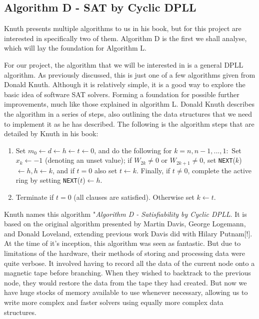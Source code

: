 \documentclass{article}
\begin{document}
\subsection{Algorithm D - SAT by Cyclic DPLL}
Knuth presents multiple algorithms to us in his book, but for this project are interested in specifically two of them. Algorithm D
is the first we shall analyse, which will lay the foundation for Algorithm L. 

For our project, the algorithm that we will be interested in is a general DPLL algorithm. As
previously discussed, this is just one of a few algorithms given from Donald Knuth. Although it is
relatively simple, it is a good way to explore the basic idea of software SAT solvers. Forming a
foundation for possible further improvements, much like those explained in algorithm L. Donald Knuth
describes the algorithm in a series of steps, also outlining the data structures that we need to
implement it as he has described. The following is the algorithm steps that are detailed by Knuth in his book:

\begin{enumerate}
    \item Set $m_0 \leftarrow d \leftarrow h \leftarrow t \leftarrow 0$, and do the following for $k = n, n - 1, ..., 1:$ Set $x_k ← -1$ (denoting an unset value); if $W_{2k} \neq 0$ or $W_{2k+1} \neq 0$, set \texttt{NEXT}($k$) $ \leftarrow h, h \leftarrow k$, and if $t = 0$ also set $t \leftarrow k$. Finally, if $t \neq 0$, complete the active ring by setting \texttt{NEXT}($t$)$ \leftarrow h$.
    \item Terminate if $t = 0$ (all clauses are satisfied). Otherwise set $k \leftarrow t$.
\end{enumerate}

Knuth names this algorithm "\textit{Algorithm D - Satisfiability by Cyclic DPLL}. It is based on the
original algorithm presented by Martin Davis, George Logemann, and Donald Loveland\cite{dpll},
extending previous work Davis did with Hilary Putnam[!]. At the time of it's inception, this
algorithm was seen as fantastic. But due to limitations of the hardware, their methods of storing
and processing data were quite verbose. It involved having to record all the data of the current
node onto a magnetic tape before branching. When they wished to backtrack to the previous node,
they would restore the data from the tape they had created. But now we have huge stocks of memory
available to use whenever necessary, allowing us to write more complex and faster solvers using
equally more complex data structures.
\end{document}

